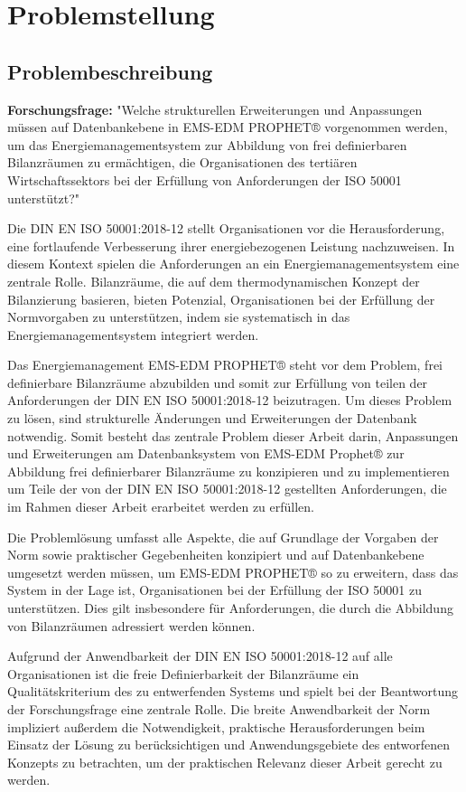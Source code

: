 \section{Problemstellung}
\subsection{Problembeschreibung}
\textbf{Forschungsfrage:} "Welche strukturellen Erweiterungen und Anpassungen müssen auf Datenbankebene in EMS-EDM PROPHET® vorgenommen werden, um das 
Energiemanagementsystem zur Abbildung von frei definierbaren Bilanzräumen zu ermächtigen, die Organisationen des tertiären Wirtschaftssektors bei der 
Erfüllung von Anforderungen der ISO 50001 unterstützt?"

Die DIN EN ISO 50001:2018-12 stellt Organisationen vor die Herausforderung, eine fortlaufende Verbesserung ihrer energiebezogenen Leistung nachzuweisen. 
In diesem Kontext spielen die Anforderungen an ein Energiemanagementsystem eine zentrale Rolle. Bilanzräume, die auf dem thermodynamischen Konzept der 
Bilanzierung basieren, bieten Potenzial, Organisationen bei der Erfüllung der Normvorgaben zu unterstützen, indem sie systematisch in das Energiemanagementsystem 
integriert werden.  

Das Energiemanagement EMS-EDM PROPHET® steht vor dem Problem, frei definierbare Bilanzräume abzubilden und somit zur Erfüllung von teilen der Anforderungen 
der DIN EN ISO 50001:2018-12 beizutragen.
Um dieses Problem zu lösen, sind strukturelle Änderungen und Erweiterungen der Datenbank notwendig.
Somit besteht das zentrale Problem dieser Arbeit darin, Anpassungen und Erweiterungen am Datenbanksystem von EMS-EDM Prophet® zur Abbildung 
frei definierbarer Bilanzräume zu konzipieren und zu implementieren um Teile der von der DIN EN ISO 50001:2018-12 gestellten Anforderungen, die im Rahmen dieser 
Arbeit erarbeitet werden zu erfüllen.

Die Problemlösung umfasst alle Aspekte, die auf Grundlage der Vorgaben der Norm sowie praktischer Gegebenheiten konzipiert und auf Datenbankebene 
umgesetzt werden müssen, um EMS-EDM PROPHET® so zu erweitern, dass das System in der Lage ist, Organisationen bei der Erfüllung der ISO 50001 zu 
unterstützen. Dies gilt insbesondere für Anforderungen, die durch die Abbildung von Bilanzräumen adressiert werden können.

Aufgrund der Anwendbarkeit der DIN EN ISO 50001:2018-12 auf alle Organisationen ist die freie Definierbarkeit der Bilanzräume ein Qualitätskriterium des zu 
entwerfenden Systems und spielt bei der Beantwortung der Forschungsfrage eine zentrale Rolle.
Die breite Anwendbarkeit der Norm impliziert außerdem die Notwendigkeit, praktische Herausforderungen beim Einsatz der Lösung zu berücksichtigen und 
Anwendungsgebiete des entworfenen Konzepts zu betrachten, um der praktischen Relevanz dieser Arbeit gerecht zu werden.

